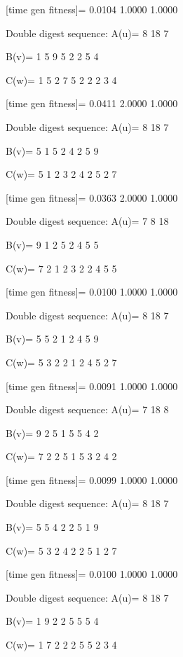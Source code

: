 [time gen fitness]=
    0.0104    1.0000    1.0000

Double digest sequence:
A(u)=
     8    18     7

B(v)=
     1     5     9     5     2     2     5     4

C(w)=
     1     5     2     7     5     2     2     2     3     4

[time gen fitness]=
    0.0411    2.0000    1.0000

Double digest sequence:
A(u)=
     8    18     7

B(v)=
     5     1     5     2     4     2     5     9

C(w)=
     5     1     2     3     2     4     2     5     2     7

[time gen fitness]=
    0.0363    2.0000    1.0000

Double digest sequence:
A(u)=
     7     8    18

B(v)=
     9     1     2     5     2     4     5     5

C(w)=
     7     2     1     2     3     2     2     4     5     5

[time gen fitness]=
    0.0100    1.0000    1.0000

Double digest sequence:
A(u)=
     8    18     7

B(v)=
     5     5     2     1     2     4     5     9

C(w)=
     5     3     2     2     1     2     4     5     2     7

[time gen fitness]=
    0.0091    1.0000    1.0000

Double digest sequence:
A(u)=
     7    18     8

B(v)=
     9     2     5     1     5     5     4     2

C(w)=
     7     2     2     5     1     5     3     2     4     2

[time gen fitness]=
    0.0099    1.0000    1.0000

Double digest sequence:
A(u)=
     8    18     7

B(v)=
     5     5     4     2     2     5     1     9

C(w)=
     5     3     2     4     2     2     5     1     2     7

[time gen fitness]=
    0.0100    1.0000    1.0000

Double digest sequence:
A(u)=
     8    18     7

B(v)=
     1     9     2     2     5     5     5     4

C(w)=
     1     7     2     2     2     5     5     2     3     4

